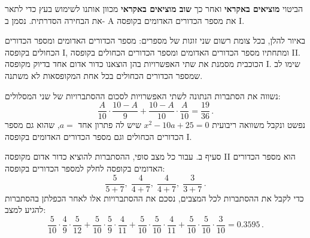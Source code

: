 \documentclass[12pt,a4paper]{article}
\begin{document}
הביטוי
\textbf{מוציאים באקראי}
ואחר כך
\textbf{שוב מוציאים באקראי}
מכוון אותנו לשימוש בעץ כדי לתאר את הבחירה הסדרתית. נסמן ב-%
\textsf{A}
את מספר הכדורים האדומים בקופסה 
\textsf{I}.

באיור להלן, בכל צומת רשום שני זוגות של מספרים: מספר הכדורים האדומים ומספר הכדורים הכחולים בקופסה
\textsf{I},
ומתחתיו מספר הכדורים האדומים ומספר הכדורים הכחולים בקופסה
\textsf{II}.
הכוכבית מסמנת את שתי האפשרויות בהן הוצאנו כדור אדום אחד בדיוק מקופסה
\textsf{I}.
שימו לב שמספר הכדורים הכחולים בכל אחת המקופסאות לא משתנה.
\begin{center}
\end{center}
נשווה את הסתברות הנתונה לשתי האפשרויות לסכום ההסתברויות של שני המסלולים:
\[
\frac{A}{10}\cdot\frac{10-A}{9} + \frac{10-A}{10}\cdot\frac{A}{10} = \frac{19}{36}\,.
\]
נפשט ונקבל משוואה ריבועית 
$x^2-10a+25=0$
שיש לה פתרון אחד
$a=$,
שהוא גם מספר הכדורים הכחולים  וגם מספר הכדורים האדומים בקופסה
\textsf{I}.

סעיף ב. עבור כל מצב סופי, ההסתברות להוציא כדור אדום מקופסה
\textsf{II}
הוא מספר הכדורים האדומים בקופסה לחלק למספר הכדורים בקופסה:
\[
\frac{5}{5+7},\; \frac{4}{4+7},\; \frac{4}{4+7},\; \frac{3}{3+7}\,.
\]
כדי לקבל את ההסתברות לכל המצבים, נסכם את ההסתברויות אלו לאחר הכפלתן בהסתברות להגיע למצב:
\[
\frac{5}{10}\cdot\frac{4}{9}\cdot\frac{5}{12}+\frac{5}{10}\cdot\frac{5}{9}\cdot\frac{4}{11}+\frac{5}{10}\cdot\frac{5}{10}\cdot\frac{4}{11}+\frac{5}{10}\cdot\frac{5}{10}\cdot\frac{3}{10}=0.3595\,.
\]
\end{document}
